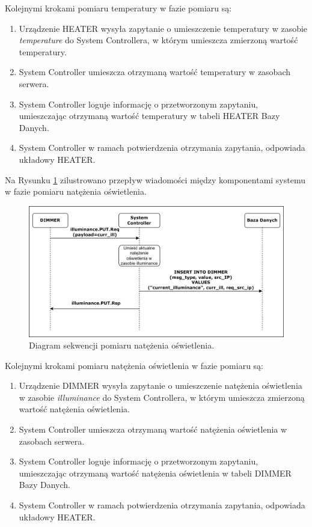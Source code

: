             Kolejnymi krokami pomiaru temperatury w fazie pomiaru są:
            \begin{enumerate}
                \item Urządzenie HEATER wysyła zapytanie o umieszczenie temperatury w zasobie \textit{temperature} do System Controllera, w którym umieszcza zmierzoną wartość temperatury.
                \item System Controller umieszcza otrzymaną wartość temperatury w zasobach serwera.
                \item System Controller loguje informację o przetworzonym zapytaniu, umieszczając otrzymaną wartość temperatury w tabeli HEATER Bazy Danych.
                \item System Controller w ramach potwierdzenia otrzymania zapytania, odpowiada układowy HEATER.
            \end{enumerate}

            Na Rysunku \ref{fig:seq-dimmer-measure} zilustrowano przepływ wiadomości między komponentami systemu w fazie pomiaru natężenia oświetlenia.

            \begin{figure}[H]
                \centering
                \includegraphics[width=0.8\linewidth]{graphics/sequence-diagrams/dimmer-measure-seq.png}
                \caption{Diagram sekwencji pomiaru natężenia oświetlenia.}
                \label{fig:seq-dimmer-measure}
            \end{figure}

            Kolejnymi krokami pomiaru natężenia oświetlenia w fazie pomiaru są:
            \begin{enumerate}
                \item Urządzenie DIMMER wysyła zapytanie o umieszczenie natężenia oświetlenia w zasobie \textit{illuminance} do System Controllera, w którym umieszcza zmierzoną wartość natężenia oświetlenia.
                \item System Controller umieszcza otrzymaną wartość natężenia oświetlenia w zasobach serwera.
                \item System Controller loguje informację o przetworzonym zapytaniu, umieszczając otrzymaną wartość natężenia oświetlenia w tabeli DIMMER Bazy Danych.
                \item System Controller w ramach potwierdzenia otrzymania zapytania, odpowiada układowy HEATER.
            \end{enumerate}


